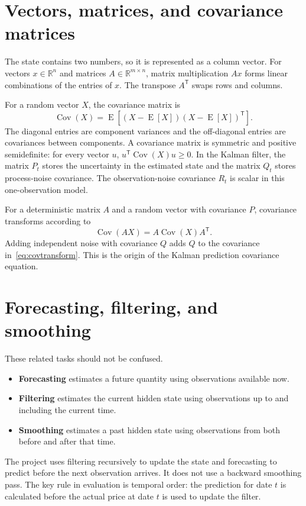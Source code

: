 \documentclass[12pt,a4paper,oneside]{report}
\numberwithin{equation}{chapter}
\numberwithin{figure}{chapter}
\numberwithin{table}{chapter}
\theoremstyle{definition}
\theoremstyle{plain}
\DeclareMathOperator{\Cov}{Cov}
\DeclareMathOperator{\E}{E}
\newcommand{\R}{\mathbb{R}}
\newcommand{\1}{\mathbf{1}}
\newcommand{\trans}{^{\mathsf T}}
\begin{document}
\section{Vectors, matrices, and covariance matrices}
The state contains two numbers, so it is represented as a column vector. For vectors $x\in\R^n$ and matrices $A\in\R^{m\times n}$, matrix multiplication $Ax$ forms linear combinations of the entries of $x$. The transpose $A\trans$ swaps rows and columns.

For a random vector $X$, the covariance matrix is
\begin{equation}
  \Cov(X)=\E\left[(X-\E[X])(X-\E[X])\trans\right].
\end{equation}
The diagonal entries are component variances and the off-diagonal entries are covariances between components. A covariance matrix is symmetric and positive semidefinite: for every vector $u$, $u\trans\Cov(X)u\geq 0$. In the Kalman filter, the matrix $P_t$ stores the uncertainty in the estimated state and the matrix $Q_t$ stores process-noise covariance. The observation-noise covariance $R_t$ is scalar in this one-observation model.

For a deterministic matrix $A$ and a random vector with covariance $P$, covariance transforms according to
\begin{equation}
  \Cov(AX)=A\Cov(X)A\trans.
  \label{eq:covtransform}
\end{equation}
Adding independent noise with covariance $Q$ adds $Q$ to the covariance in~\eqref{eq:covtransform}. This is the origin of the Kalman prediction covariance equation.

\section{Forecasting, filtering, and smoothing}
These related tasks should not be confused.
\begin{itemize}
  \item \textbf{Forecasting} estimates a future quantity using observations available now.
  \item \textbf{Filtering} estimates the current hidden state using observations up to and including the current time.
  \item \textbf{Smoothing} estimates a past hidden state using observations from both before and after that time.
\end{itemize}
The project uses filtering recursively to update the state and forecasting to predict before the next observation arrives. It does not use a backward smoothing pass. The key rule in evaluation is temporal order: the prediction for date $t$ is calculated before the actual price at date $t$ is used to update the filter.
\end{document}
